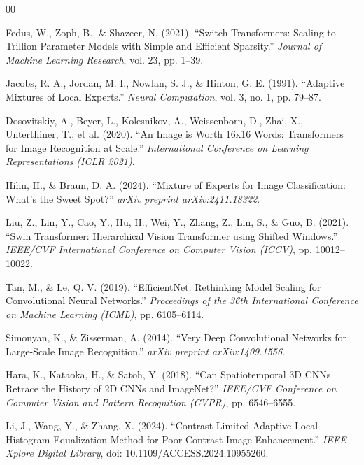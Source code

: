 \documentclass[conference]{IEEEtran}
\begin{document}


\begin{thebibliography}{00}

 Fedus, W., Zoph, B., \& Shazeer, N. (2021). ``Switch Transformers: Scaling to Trillion Parameter Models with Simple and Efficient Sparsity.'' \textit{Journal of Machine Learning Research}, vol. 23, pp. 1--39.

 Jacobs, R. A., Jordan, M. I., Nowlan, S. J., \& Hinton, G. E. (1991). ``Adaptive Mixtures of Local Experts.'' \textit{Neural Computation}, vol. 3, no. 1, pp. 79--87.

 Dosovitskiy, A., Beyer, L., Kolesnikov, A., Weissenborn, D., Zhai, X., Unterthiner, T., et al. (2020). ``An Image is Worth 16x16 Words: Transformers for Image Recognition at Scale.'' \textit{International Conference on Learning Representations (ICLR 2021)}.

 Hihn, H., \& Braun, D. A. (2024). ``Mixture of Experts for Image Classification: What's the Sweet Spot?'' \textit{arXiv preprint arXiv:2411.18322}.

 Liu, Z., Lin, Y., Cao, Y., Hu, H., Wei, Y., Zhang, Z., Lin, S., \& Guo, B. (2021). ``Swin Transformer: Hierarchical Vision Transformer using Shifted Windows.'' \textit{IEEE/CVF International Conference on Computer Vision (ICCV)}, pp. 10012--10022.

 Tan, M., \& Le, Q. V. (2019). ``EfficientNet: Rethinking Model Scaling for Convolutional Neural Networks.'' \textit{Proceedings of the 36th International Conference on Machine Learning (ICML)}, pp. 6105--6114.

 Simonyan, K., \& Zisserman, A. (2014). ``Very Deep Convolutional Networks for Large-Scale Image Recognition.'' \textit{arXiv preprint arXiv:1409.1556}.

 Hara, K., Kataoka, H., \& Satoh, Y. (2018). ``Can Spatiotemporal 3D CNNs Retrace the History of 2D CNNs and ImageNet?'' \textit{IEEE/CVF Conference on Computer Vision and Pattern Recognition (CVPR)}, pp. 6546--6555.

 Li, J., Wang, Y., \& Zhang, X. (2024). ``Contrast Limited Adaptive Local Histogram Equalization Method for Poor Contrast Image Enhancement.'' \textit{IEEE Xplore Digital Library}, doi: 10.1109/ACCESS.2024.10955260.


\end{thebibliography}
\end{document}
